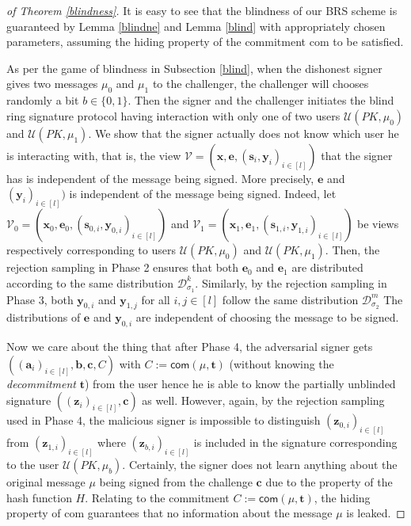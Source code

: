 \documentclass[conference]{IEEEtran}
\newtheorem{proof}{Proof}
\begin{document}
	\begin{proof}[of Theorem \ref{blindness}] It is easy to see that the blindness of our \textsf{BRS} scheme is guaranteed by Lemma \ref{blindne} and Lemma \ref{blind} with appropriately chosen parameters, assuming the hiding property of the commitment \textsf{com} to be satisfied.   
		
		\iffalse
		As per the game of blindness in Subsection \ref{blind}, when the dishonest signer gives two messages $\mu_0$ and $\mu_1$ to the challenger, the challenger will chooses randomly a bit $b \in \{0,1\}$. Then the signer and the challenger initiates the blind ring signature protocol having interaction with only one of two users $\mathcal{U}(PK, \mu_0)$ and $\mathcal{U}(PK, \mu_{1})$. We show that the signer actually does not know which user he is interacting with, that is, the view $\mathcal{V}=(\mathbf{x},\mathbf{e}, (\mathbf{s}_i, \mathbf{y}_i)_{i \in [l]})$ that the signer has is independent of the message being signed. More precisely, $\mathbf{e}$ and $(\mathbf{y}_i)_{i \in [l]})$ is independent of the message being signed. 	Indeed, let $\mathcal{V}_0=(\mathbf{x}_0,\mathbf{e}_0, (\mathbf{s}_{0,i}, \mathbf{y}_{0,i})_{i \in [l]})$ and $\mathcal{V}_1=(\mathbf{x}_1,\mathbf{e}_1, (\mathbf{s}_{1,i}, \mathbf{y}_{1,i})_{i \in [l]})$ be views respectively corresponding to users $\mathcal{U}(PK, \mu_0)$ and $\mathcal{U}(PK, \mu_{1})$.
		Then, the rejection sampling in Phase 2 ensures that both $\mathbf{e}_0$ and $\mathbf{e}_1$ are distributed according to the same distribution $\mathcal{D}_{\sigma_1}^k$. Similarly, by the rejection sampling in Phase 3, both $\mathbf{y}_{0,i}$ and $\mathbf{y}_{1,j}$ for all $i, j \in [l]$ follow the same distribution $\mathcal{D}_{\sigma_2}^m$ The distributions of $\mathbf{e}$ and $\mathbf{y}_{0,i}$ are independent of choosing the message to be signed.
		
		Now we care about the thing that after Phase 4, the adversarial signer gets $((\mathbf{a}_i)_{i\in[l]}, \mathbf{b}, \mathbf{c}, C)$ with $C:=\mathsf{com}(\mu,\mathbf{t})$ (without knowing the \textit{decommitment} $\mathbf{t}$) from the user hence he is able to know the partially unblinded signature $((\mathbf{z}_i)_{i \in [l]}, \mathbf{c})$ as well. However, again, by the rejection sampling used in Phase 4, the malicious signer is impossible to distinguish $(\mathbf{z}_{0,i})_{i \in [l]}$ from $(\mathbf{z}_{1,i})_{i \in [l]}$ where $(\mathbf{z}_{b,i})_{i \in [l]}$ is included in the signature corresponding to the user $\mathcal{U}(PK, \mu_b)$. Certainly, the signer does not learn anything about the original message $\mu$ being signed from the challenge $\mathbf{c}$ due to the property of the hash function $H$. Relating to the commitment $C:=\mathsf{com}(\mu,\mathbf{t})$, the hiding property of \textsf{com} guarantees that no information about the message $\mu$ is leaked.
		

\end{proof}
\end{document}
